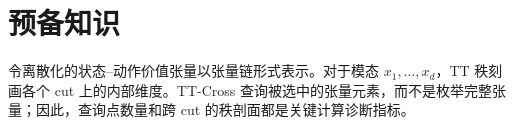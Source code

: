 \section{预备知识}

令离散化的状态--动作价值张量以张量链形式表示。对于模态 \(x_1,\ldots,x_d\)，TT 秩刻画各个 cut 上的内部维度。TT-Cross 查询被选中的张量元素，而不是枚举完整张量；因此，查询点数量和跨 cut 的秩剖面都是关键计算诊断指标。
